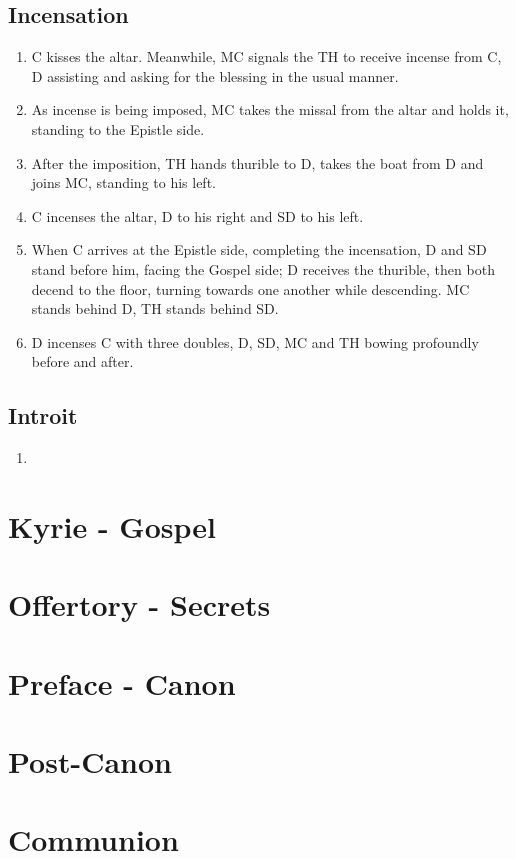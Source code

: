 \documentclass[letterpaper, twocolumn]{article}
\begin{document}
		\subsection*{Incensation}
		\begin{enumerate}
			\item C kisses the altar. Meanwhile, MC signals the TH to receive incense from C, D assisting and asking for the blessing in the usual manner.
			\item As incense is being imposed, MC takes the missal from the altar and holds it, standing to the Epistle side. 
			\item After the imposition, TH hands thurible to D, takes the boat from D and joins MC, standing to his left.
			\item C incenses the altar, D to his right and SD to his left.
			\item When C arrives at the Epistle side, completing the incensation, D and SD stand before him, facing the Gospel side; D receives the thurible, then both decend to the floor, turning towards one another while descending. MC stands behind D, TH stands behind SD.
			\item D incenses C with three doubles, D, SD, MC and TH bowing profoundly before and after.
		\end{enumerate}
		\subsection*{Introit}
		\begin{enumerate}
			\item 
		\end{enumerate}
	\section*{Kyrie - Gospel}
	\section*{Offertory - Secrets}
	\section*{Preface - Canon}
	\section*{Post-Canon}
	\section*{Communion}
\end{document}
